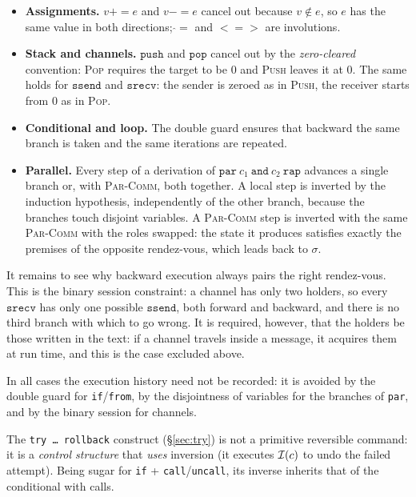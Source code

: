 \begin{itemize}
  \item \textbf{Assignments.} $v \mathbin{+\!\!=} e$ and $v \mathbin{-\!\!=} e$
    cancel out because $v \notin e$, so $e$ has the same value in both directions;
    $\mathbin{\hat{}\!=}$ and $\mathbin{<\!=\!>}$ are involutions.
  \item \textbf{Stack and channels.} $\mathtt{push}$ and $\mathtt{pop}$ cancel out by
    the \emph{zero-cleared} convention: \textsc{Pop} requires the target to be $0$ and
    \textsc{Push} leaves it at $0$. The same holds for $\mathtt{ssend}$ and
    $\mathtt{srecv}$: the sender is zeroed as in \textsc{Push}, the receiver
    starts from $0$ as in \textsc{Pop}.
  \item \textbf{Conditional and loop.} The double guard ensures that backward
    the same branch is taken and the same iterations are repeated.
  \item \textbf{Parallel.} Every step of a derivation of
    $\mathtt{par}\ c_1\ \mathtt{and}\ c_2\ \mathtt{rap}$ advances a single branch
    or, with \textsc{Par-Comm}, both together. A local step is inverted
    by the induction hypothesis, independently of the other branch, because the branches
    touch disjoint variables. A \textsc{Par-Comm} step is inverted with the
    same \textsc{Par-Comm} with the roles swapped: the state it produces satisfies
    exactly the premises of the opposite rendez-vous, which leads back to $\sigma$.
\end{itemize}

\noindent
It remains to see why backward execution always pairs the right
rendez-vous. This is the binary session constraint: a channel has only two
holders, so every $\mathtt{srecv}$ has only one possible $\mathtt{ssend}$, both
forward and backward, and there is no third branch with which to go wrong. It is
required, however, that the holders be those written in the text: if a channel travels inside a
message, it acquires them at run time, and this is the case excluded above.

In all cases the execution history need not be recorded: it is avoided by the
double guard for \texttt{if}/\texttt{from}, by the disjointness of variables
for the branches of \texttt{par}, and by the binary session for channels.

\medskip
\noindent
The \texttt{try\,\dots\,rollback} construct (\S\ref{sec:try}) is not a primitive
reversible command: it is a \emph{control structure} that \emph{uses}
inversion (it executes $\mathcal{I}(c)$ to undo the failed attempt). Being
sugar for \texttt{if} + \texttt{call}/\texttt{uncall}, its inverse inherits
that of the conditional with calls.

